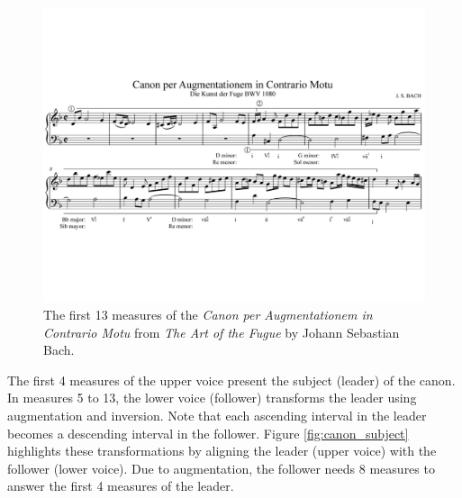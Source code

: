 \begin{figure}[!h]
 \centering
 \includegraphics[width=\columnwidth]{imgs/background/canon_a.pdf}
 \caption{The first 13 measures of the \textit{Canon per Augmentationem in Contrario Motu} from \textit{The Art of the Fugue} by Johann Sebastian Bach.}
 \label{fig:canon}
\end{figure}

The first 4 measures of the upper voice present the subject (leader) of the canon. In measures 5 to 13, the lower voice (follower) transforms the leader using augmentation and inversion. Note that each ascending interval in the leader becomes a descending interval in the follower. Figure \ref{fig:canon_subject} highlights these transformations by aligning the leader (upper voice) with the follower (lower voice). Due to augmentation, the follower needs 8 measures to answer the first 4 measures of the leader.

